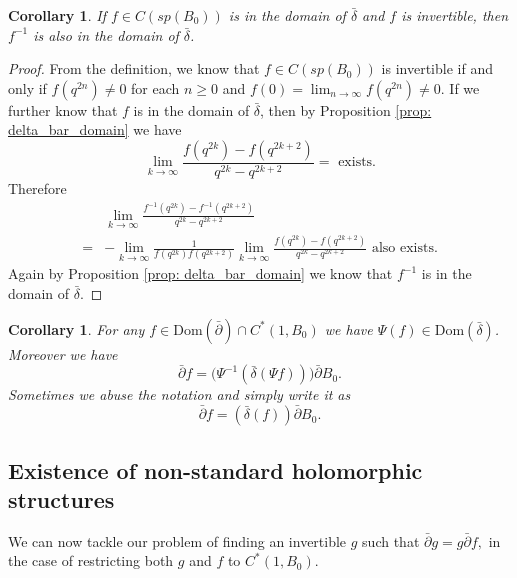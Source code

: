 \documentclass[12pt]{article}
\newtheorem{corollary}[definition]{Corollary}
\numberwithin{equation}{section}
\def\Dom{{\mathrm {Dom}}}
\def\pb{\bar{\partial}}
\def\db{\bar{\delta}}
\def\d{\bar{\delta}}
\begin{document}
\begin{corollary}\label{coro: inverse domain d}
    If  $f\in C(sp(B_0))$ is in the domain of $\d$ and $f$ is invertible, then $f^{-1}$ is also in the domain of $\d$.
\end{corollary}
\begin{proof}
From the definition, we know that $f\in C(sp(B_0))$ is invertible if and only if $f(q^{2n})\neq 0$ for each $n\geq 0$ and $f(0)=\lim_{n\to \infty}f(q^{2n})\neq 0$. If we further know that $f$ is in the domain of $\d$, then by Proposition \ref{prop: delta_bar_domain} we have
  $$
    \lim_{k\to \infty}\frac{f(q^{2k})-f(q^{2k+2})}{q^{2k}-q^{2k+2}}= \text{ exists.}
    $$
    Therefore
      \begin{equation*}
      \begin{split}
    &\lim_{k\to \infty}\frac{f^{-1}(q^{2k})-f^{-1}(q^{2k+2})}{q^{2k}-q^{2k+2}} \\
    =& -\lim_{k\to \infty}\frac{1}{f(q^{2k})f(q^{2k+2})}\lim_{k\to \infty}\frac{f(q^{2k})-f(q^{2k+2})}{q^{2k}-q^{2k+2}}\text{ also exists.}
    \end{split}
    \end{equation*}
    Again by Proposition \ref{prop: delta_bar_domain} we know that $f^{-1}$ is in the domain of $\d$.
\end{proof}

\begin{corollary} \label{coro: db and pb correspond general}
    For any $f\in \Dom(\pb)\cap C^*(1, B_0)$ we have $\Psi(f)\in \Dom(\db)$. Moreover we have 
    \begin{equation}
        \pb f=\big (\Psi^{-1}(\db (\Psi f))\big )\pb B_0.
    \end{equation}
    Sometimes we abuse the notation and simply write it as 
        \begin{equation}\label{eq: db and pb correspond general}
        \pb f=(\db ( f))\pb B_0.
    \end{equation}
\end{corollary}

\subsection{Existence of non-standard holomorphic structures}\label{subsec: existence of non standard holo structures}
We can now tackle our problem of finding an invertible $g$ such that $\pb g = g \pb f,$ in the case of restricting both $g$ and $f$ to $C^*(1, B_0).$  
\end{document}
